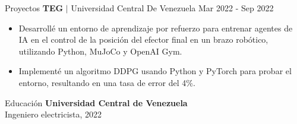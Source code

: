 \documentclass{resume} %
\begin{document}
    


\begin{rSection}{Proyectos}
    \textbf{TEG} $\mid$ Universidad Central De Venezuela \hfill Mar 2022 - Sep 2022
    
    \begin{itemize}
        \item Desarrollé un entorno de aprendizaje por refuerzo para entrenar agentes de IA en el control de la posición del efector final en un brazo robótico, utilizando Python, MuJoCo y OpenAI Gym.

        \item Implementé un algoritmo DDPG usando Python y PyTorch para probar el entorno, resultando en una tasa de error del 4\%.
    \end{itemize}
\end{rSection}



    

\begin{rSection}{Educación} %
    \textbf{Universidad Central de Venezuela}\\
        Ingeniero electricista, 2022
\end{rSection}


    
\end{document}
